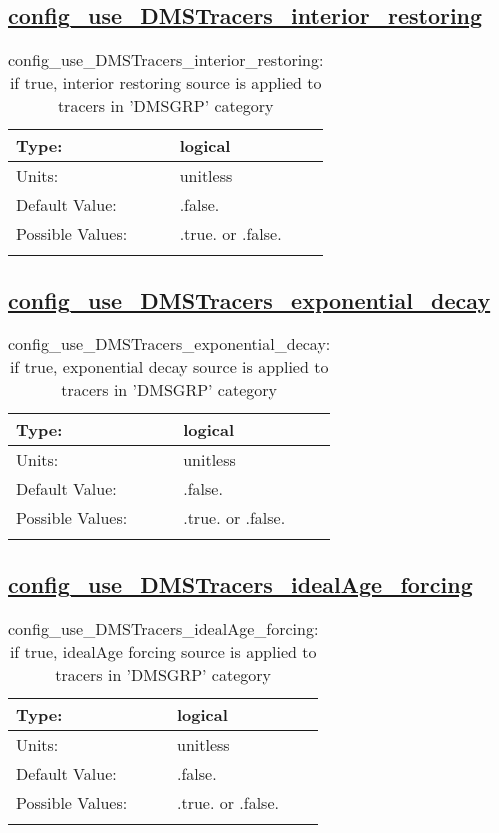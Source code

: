 \subsection[config\_use\_DMSTracers\_interior\_restoring]{\hyperref[sec:nm_tab_tracer_forcing_DMSTracers]{config\_use\_DMSTracers\_interior\_restoring}}
\label{subsec:nm_sec_config_use_DMSTracers_interior_restoring}
\begin{center}
\begin{longtable}{| p{2.0in} || p{4.0in} |}
    \hline
    Type: & logical \\
    \hline
    Units: & \si{unitless} \\
    \hline
    Default Value: & .false. \\
    \hline
    Possible Values: & .true. or .false. \\
    \hline
    \caption{config\_use\_DMSTracers\_interior\_restoring: if true, interior restoring source is applied to tracers in 'DMSGRP' category}
\end{longtable}
\end{center}
\subsection[config\_use\_DMSTracers\_exponential\_decay]{\hyperref[sec:nm_tab_tracer_forcing_DMSTracers]{config\_use\_DMSTracers\_exponential\_decay}}
\label{subsec:nm_sec_config_use_DMSTracers_exponential_decay}
\begin{center}
\begin{longtable}{| p{2.0in} || p{4.0in} |}
    \hline
    Type: & logical \\
    \hline
    Units: & \si{unitless} \\
    \hline
    Default Value: & .false. \\
    \hline
    Possible Values: & .true. or .false. \\
    \hline
    \caption{config\_use\_DMSTracers\_exponential\_decay: if true, exponential decay source is applied to tracers in 'DMSGRP' category}
\end{longtable}
\end{center}
\subsection[config\_use\_DMSTracers\_idealAge\_forcing]{\hyperref[sec:nm_tab_tracer_forcing_DMSTracers]{config\_use\_DMSTracers\_idealAge\_forcing}}
\label{subsec:nm_sec_config_use_DMSTracers_idealAge_forcing}
\begin{center}
\begin{longtable}{| p{2.0in} || p{4.0in} |}
    \hline
    Type: & logical \\
    \hline
    Units: & \si{unitless} \\
    \hline
    Default Value: & .false. \\
    \hline
    Possible Values: & .true. or .false. \\
    \hline
    \caption{config\_use\_DMSTracers\_idealAge\_forcing: if true, idealAge forcing source is applied to tracers in 'DMSGRP' category}
\end{longtable}
\end{center}
